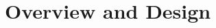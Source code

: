 \documentclass{article} %
\newcommand{\relbench}{\textsc{RelBench}\xspace}
\begin{document}




\section{Overview and Design} \label{sec:overview-design}
\end{document}
